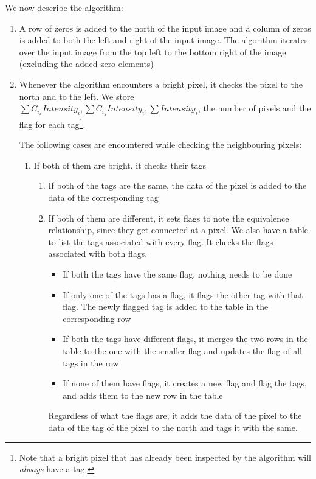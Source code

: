 \documentclass[../../main.tex]{subfiles}
\begin{document}
We now describe the algorithm:
\begin{enumerate}
    \item A row of zeros is added to the north of the input image and a column of zeros is added to both the left and right of the input image. The algorithm iterates over the input image from the top left to the bottom right of the image (excluding the added zero elements)
    \item Whenever the algorithm encounters a bright pixel, it checks the pixel to the north and to the left. We store $ \sum C_{i_{x}}Intensity_{i}, \sum C_{i_{y}}Intensity_{i}, \sum Intensity_{i} $, the number of pixels and the flag for each tag\footnote{Note that a bright pixel that has already been inspected by the algorithm will \emph{always} have a tag.}.
    
    The following cases are encountered while checking the neighbouring pixels:
    \begin{enumerate}
        \item If both of them are bright, it checks their tags
        \begin{enumerate}
            \item If both of the tags are the same, the data of the pixel is added to the data of the corresponding tag
            \item If both of them are different, it sets flags to note the equivalence relationship, since they get connected at a pixel. We also have a table to list the tags associated with every flag. It checks the flags associated with both flags.
            \begin{itemize}
                \item If both the tags have the same flag, nothing needs to be done
                \item If only one of the tags has a flag, it flags the other tag with that flag. The newly flagged tag is added to the table in the corresponding row
                \item If both the tags have different flags, it merges the two rows in the table to the one with the smaller flag and updates the flag of all tags in the row
                \item If none of them have flags, it creates a new flag and flag the tags, and adds them to the new row in the table
            \end{itemize}
        Regardless of what the flags are, it adds the data of the pixel to the data of the tag of the pixel to the north and tags it with the same.

\end{enumerate}
\end{enumerate}
\end{enumerate}
\end{document}
